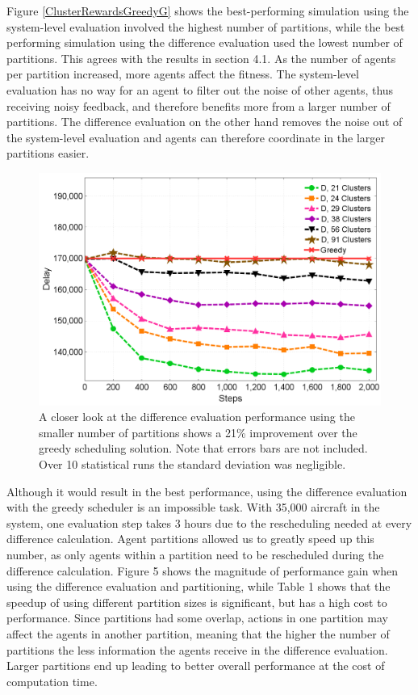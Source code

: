 \documentclass{sig-alternate}
\begin{document}
Figure \ref{ClusterRewardsGreedyG} shows the best-performing simulation using the system-level evaluation involved the highest number of partitions, while the best performing simulation using the difference evaluation used the lowest number of partitions. This agrees with the results in section 4.1. As the number of agents per partition increased, more agents affect the fitness. The system-level evaluation has no way for an agent to filter out the noise of other agents, thus receiving noisy feedback, and therefore benefits more from a larger number of partitions. The difference evaluation on the other hand removes the noise out of the system-level evaluation and agents can therefore coordinate in the larger partitions easier.

\begin{figure}[tbh!]
\centering
\includegraphics[width=1.0\columnwidth]{greedyVsDifferenceEvo}
\caption{A closer look at the difference evaluation performance using the smaller number of partitions shows a 21\% improvement over the greedy scheduling solution. Note that errors bars are not included. Over 10 statistical runs the standard deviation was negligible. }
\label{greedyVsDifferenceEvo}
\end{figure}

Although it would result in the best performance, using the difference evaluation with the greedy scheduler is an impossible task. With 35,000 aircraft in the system, one evaluation step takes 3 hours due to the rescheduling needed at every difference calculation. Agent partitions allowed us to greatly speed up this number, as only agents within a partition need to be rescheduled during the difference calculation. Figure 5 shows the magnitude of performance gain when using the difference evaluation and partitioning, while Table 1 shows that the speedup of using different partition sizes is significant, but has a high cost to performance. Since partitions had some overlap, actions in one partition may affect the agents in another partition, meaning that the higher the number of partitions the less information the agents receive in the difference evaluation. Larger partitions end up leading to better overall performance at the cost of computation time.
\end{document}
